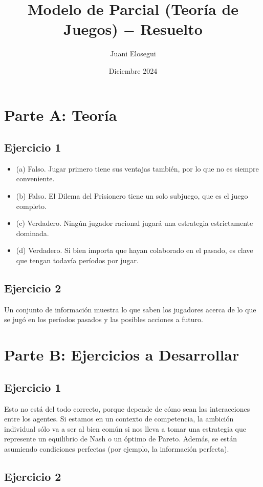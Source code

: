\documentclass{article}
\title{Modelo de Parcial (Teoría de Juegos) $-$ Resuelto}
\author{Juani Elosegui}
\date{Diciembre 2024}
\begin{document}
    \maketitle
    
    \section*{Parte A: Teoría}
        \subsection*{Ejercicio 1}
            \begin{itemize}
                \item (a) Falso. Jugar primero tiene sus ventajas también, por lo que no es siempre conveniente.
                \item (b) Falso. El Dilema del Prisionero tiene un solo subjuego, que es el juego completo.
                \item (c) Verdadero. Ningún jugador racional jugará una estrategia estrictamente dominada.
                \item (d) Verdadero. Si bien importa que hayan colaborado en el pasado, es clave que tengan todavía períodos por jugar.
            \end{itemize}
        \subsection*{Ejercicio 2}
            Un conjunto de información muestra lo que saben los jugadores acerca de lo que se jugó en los períodos pasados y las posibles acciones a futuro.
    \section*{Parte B: Ejercicios a Desarrollar}
        \subsection*{Ejercicio 1}
            Esto no está del todo correcto, porque depende de cómo sean las interacciones entre los agentes. Si estamos en un contexto de competencia, la ambición individual sólo va a ser al bien común si nos lleva a tomar una estrategia que represente un equilibrio de Nash o un óptimo de Pareto. Además, se están asumiendo condiciones perfectas (por ejemplo, la información perfecta).
        \subsection*{Ejercicio 2}
\end{document}
